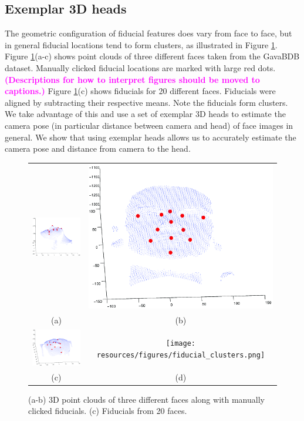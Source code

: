 \documentclass[runningheads]{llncs}
\newcommand {\ericnote} [1] {{\bf \textcolor{magenta}{(#1)}}}
\begin{document}
\subsection{Exemplar 3D heads}
The geometric configuration of fiducial features does vary from face to face, but in general fiducial locations tend to form clusters, as illustrated in Figure \ref{fig:fiducial_clusters}.  
Figure \ref{fig:fiducial_clusters}(a-c) shows point clouds of three different faces taken from the GavaBDB \cite{moreno2004gavabdb} dataset. 
Manually clicked fiducial locations are marked with large red dots.
\ericnote{Descriptions for how to interpret figures should be moved to captions.}
Figure \ref{fig:fiducial_clusters}(c) shows fiducials for 20 different faces.  Fiducials were aligned by subtracting their respective means.  
Note the fiducials form clusters.  
We take advantage of this and use a set of exemplar 3D heads to estimate the camera pose (in particular distance between camera and head) of face images in general. 
We show that using exemplar heads allows us to accurately estimate the camera pose and distance from camera to the head.

\begin{figure}[h]
\centering
\begin{tabular}{cc}
\includegraphics[width=.3\linewidth]{resources/figures/face1.png} &
\includegraphics[width=.3\linewidth]{resources/figures/face2.png} \\
(a) & (b) \\
\includegraphics[width=.3\linewidth]{resources/figures/face3.png} &
\texttt{[image: resources/figures/fiducial\_clusters.png]} \\
(c) & (d)
\end{tabular}
\caption{(a-b) 3D point clouds of three different faces along with manually clicked fiducials.  (c) Fiducials from 20 faces.}
\label{fig:fiducial_clusters}
\end{figure}
\end{document}
